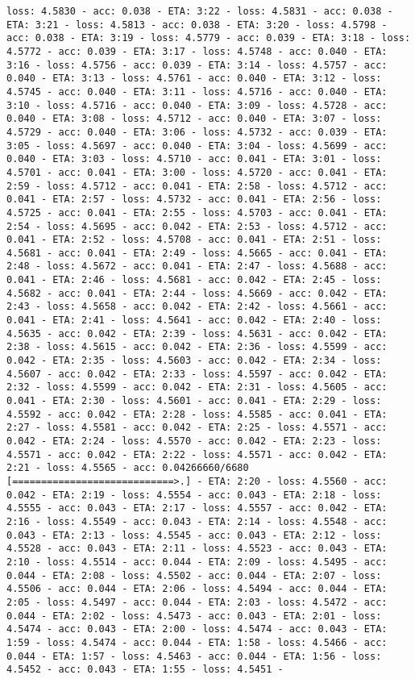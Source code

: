 \documentclass[11pt]{article}
\begin{document}
\begin{Verbatim}[commandchars=\\\{\}]
loss: 4.5830 - acc: 0.038 - ETA: 3:22 - loss: 4.5831 - acc: 0.038 - ETA: 3:21 - loss: 4.5813 - acc: 0.038 - ETA: 3:20 - loss: 4.5798 - acc: 0.038 - ETA: 3:19 - loss: 4.5779 - acc: 0.039 - ETA: 3:18 - loss: 4.5772 - acc: 0.039 - ETA: 3:17 - loss: 4.5748 - acc: 0.040 - ETA: 3:16 - loss: 4.5756 - acc: 0.039 - ETA: 3:14 - loss: 4.5757 - acc: 0.040 - ETA: 3:13 - loss: 4.5761 - acc: 0.040 - ETA: 3:12 - loss: 4.5745 - acc: 0.040 - ETA: 3:11 - loss: 4.5716 - acc: 0.040 - ETA: 3:10 - loss: 4.5716 - acc: 0.040 - ETA: 3:09 - loss: 4.5728 - acc: 0.040 - ETA: 3:08 - loss: 4.5712 - acc: 0.040 - ETA: 3:07 - loss: 4.5729 - acc: 0.040 - ETA: 3:06 - loss: 4.5732 - acc: 0.039 - ETA: 3:05 - loss: 4.5697 - acc: 0.040 - ETA: 3:04 - loss: 4.5699 - acc: 0.040 - ETA: 3:03 - loss: 4.5710 - acc: 0.041 - ETA: 3:01 - loss: 4.5701 - acc: 0.041 - ETA: 3:00 - loss: 4.5720 - acc: 0.041 - ETA: 2:59 - loss: 4.5712 - acc: 0.041 - ETA: 2:58 - loss: 4.5712 - acc: 0.041 - ETA: 2:57 - loss: 4.5732 - acc: 0.041 - ETA: 2:56 - loss: 4.5725 - acc: 0.041 - ETA: 2:55 - loss: 4.5703 - acc: 0.041 - ETA: 2:54 - loss: 4.5695 - acc: 0.042 - ETA: 2:53 - loss: 4.5712 - acc: 0.041 - ETA: 2:52 - loss: 4.5708 - acc: 0.041 - ETA: 2:51 - loss: 4.5681 - acc: 0.041 - ETA: 2:49 - loss: 4.5665 - acc: 0.041 - ETA: 2:48 - loss: 4.5672 - acc: 0.041 - ETA: 2:47 - loss: 4.5688 - acc: 0.041 - ETA: 2:46 - loss: 4.5681 - acc: 0.042 - ETA: 2:45 - loss: 4.5682 - acc: 0.041 - ETA: 2:44 - loss: 4.5669 - acc: 0.042 - ETA: 2:43 - loss: 4.5658 - acc: 0.042 - ETA: 2:42 - loss: 4.5661 - acc: 0.041 - ETA: 2:41 - loss: 4.5641 - acc: 0.042 - ETA: 2:40 - loss: 4.5635 - acc: 0.042 - ETA: 2:39 - loss: 4.5631 - acc: 0.042 - ETA: 2:38 - loss: 4.5615 - acc: 0.042 - ETA: 2:36 - loss: 4.5599 - acc: 0.042 - ETA: 2:35 - loss: 4.5603 - acc: 0.042 - ETA: 2:34 - loss: 4.5607 - acc: 0.042 - ETA: 2:33 - loss: 4.5597 - acc: 0.042 - ETA: 2:32 - loss: 4.5599 - acc: 0.042 - ETA: 2:31 - loss: 4.5605 - acc: 0.041 - ETA: 2:30 - loss: 4.5601 - acc: 0.041 - ETA: 2:29 - loss: 4.5592 - acc: 0.042 - ETA: 2:28 - loss: 4.5585 - acc: 0.041 - ETA: 2:27 - loss: 4.5581 - acc: 0.042 - ETA: 2:25 - loss: 4.5571 - acc: 0.042 - ETA: 2:24 - loss: 4.5570 - acc: 0.042 - ETA: 2:23 - loss: 4.5571 - acc: 0.042 - ETA: 2:22 - loss: 4.5571 - acc: 0.042 - ETA: 2:21 - loss: 4.5565 - acc: 0.04266660/6680 [============================>.] - ETA: 2:20 - loss: 4.5560 - acc: 0.042 - ETA: 2:19 - loss: 4.5554 - acc: 0.043 - ETA: 2:18 - loss: 4.5555 - acc: 0.043 - ETA: 2:17 - loss: 4.5557 - acc: 0.042 - ETA: 2:16 - loss: 4.5549 - acc: 0.043 - ETA: 2:14 - loss: 4.5548 - acc: 0.043 - ETA: 2:13 - loss: 4.5545 - acc: 0.043 - ETA: 2:12 - loss: 4.5528 - acc: 0.043 - ETA: 2:11 - loss: 4.5523 - acc: 0.043 - ETA: 2:10 - loss: 4.5514 - acc: 0.044 - ETA: 2:09 - loss: 4.5495 - acc: 0.044 - ETA: 2:08 - loss: 4.5502 - acc: 0.044 - ETA: 2:07 - loss: 4.5506 - acc: 0.044 - ETA: 2:06 - loss: 4.5494 - acc: 0.044 - ETA: 2:05 - loss: 4.5497 - acc: 0.044 - ETA: 2:03 - loss: 4.5472 - acc: 0.044 - ETA: 2:02 - loss: 4.5473 - acc: 0.043 - ETA: 2:01 - loss: 4.5474 - acc: 0.043 - ETA: 2:00 - loss: 4.5474 - acc: 0.043 - ETA: 1:59 - loss: 4.5474 - acc: 0.044 - ETA: 1:58 - loss: 4.5466 - acc: 0.044 - ETA: 1:57 - loss: 4.5463 - acc: 0.044 - ETA: 1:56 - loss: 4.5452 - acc: 0.043 - ETA: 1:55 - loss: 4.5451 - 
\end{Verbatim}
\end{document}
